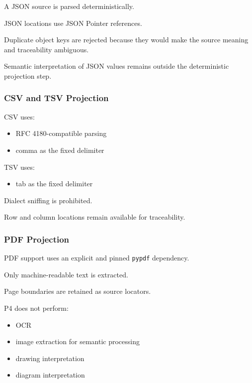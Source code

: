 A JSON source is parsed deterministically.

JSON locations use JSON Pointer references.

Duplicate object keys are rejected because they would make the source meaning and traceability ambiguous.

Semantic interpretation of JSON values remains outside the deterministic projection step.

\hypertarget{csv-and-tsv-projection}{%
\subsubsection{CSV and TSV Projection}\label{csv-and-tsv-projection}}

CSV uses:

\begin{itemize}
\tightlist
\item
  RFC 4180-compatible parsing
\item
  comma as the fixed delimiter
\end{itemize}

TSV uses:

\begin{itemize}
\tightlist
\item
  tab as the fixed delimiter
\end{itemize}

Dialect sniffing is prohibited.

Row and column locations remain available for traceability.

\hypertarget{pdf-projection}{%
\subsubsection{PDF Projection}\label{pdf-projection}}

PDF support uses an explicit and pinned \texttt{pypdf} dependency.

Only machine-readable text is extracted.

Page boundaries are retained as source locators.

P4 does not perform:

\begin{itemize}
\tightlist
\item
  OCR
\item
  image extraction for semantic processing
\item
  drawing interpretation
\item
  diagram interpretation
\end{itemize}

